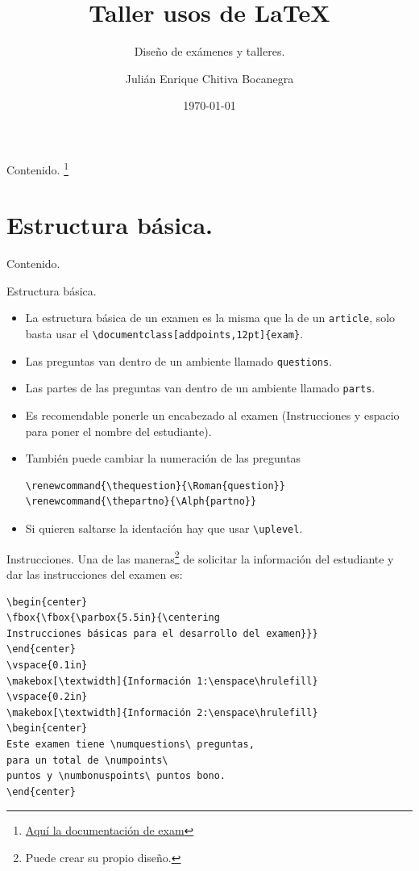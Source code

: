 \documentclass[dvipsnames,xcolor=x11names, handout]{beamer}
\title{Taller usos de \LaTeX}
\subtitle{Diseño de exámenes y talleres.}
\author[Julián Chitiva Bocanegra]{Julián Enrique Chitiva Bocanegra}
\institute[Uniandes] 
{Universidad de los Andes\\ Facultad de Economía}
\date{\today}
\theoremstyle{plain}
\theoremstyle{definition}
\begin{document}
\begin{frame}
  \titlepage
\end{frame}

\begin{frame}{Contenido.}
  \tableofcontents\footnote{\href{http://www-math.mit.edu/~psh/exam/examdoc.pdf}{Aquí la documentación de exam}}
\end{frame}

\section{Estructura básica.}
\begin{frame}{Contenido.}
  \tableofcontents[currentsection]
\end{frame}

\begin{frame}[fragile]{Estructura básica.}
\begin{itemize}[<+->]
    \item La estructura básica de un examen es la misma que la de un \verb!article!, solo basta usar el \verb!\documentclass[addpoints,12pt]{exam}!.
    \item Las preguntas van dentro de un ambiente llamado \verb!questions!.
    \item Las partes de las preguntas van dentro de un ambiente llamado \verb!parts!.
    \item Es recomendable ponerle un encabezado al examen (Instrucciones y espacio para poner el nombre del estudiante).
    \item También puede cambiar la numeración de las preguntas
\begin{verbatim}
\renewcommand{\thequestion}{\Roman{question}}
\renewcommand{\thepartno}{\Alph{partno}}
\end{verbatim}
\item Si quieren saltarse la identación hay que usar \verb!\uplevel!.
\end{itemize}
\end{frame}

\begin{frame}[fragile]{Instrucciones.}
    Una de las maneras\footnote{Puede crear su propio diseño.} de solicitar la información del estudiante y dar las instrucciones del examen es:
\begin{verbatim}
\begin{center}
\fbox{\fbox{\parbox{5.5in}{\centering
Instrucciones básicas para el desarrollo del examen}}}
\end{center}
\vspace{0.1in}
\makebox[\textwidth]{Información 1:\enspace\hrulefill}
\vspace{0.2in}
\makebox[\textwidth]{Información 2:\enspace\hrulefill}
\begin{center}
Este examen tiene \numquestions\ preguntas,
para un total de \numpoints\
puntos y \numbonuspoints\ puntos bono.
\end{center}
\end{verbatim}
\end{frame}
\end{document}
